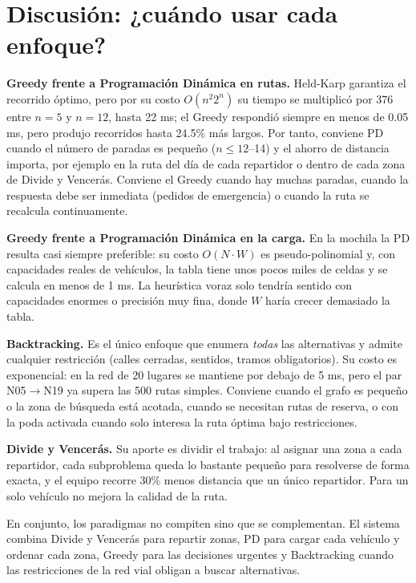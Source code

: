 \section{Discusión: ¿cuándo usar cada enfoque?}

\textbf{Greedy frente a Programación Dinámica en rutas.} Held-Karp garantiza el recorrido óptimo, pero por su costo $O(n^2 2^n)$ su tiempo se multiplicó por 376 entre $n=5$ y $n=12$, hasta 22 ms; el Greedy respondió siempre en menos de 0.05 ms, pero produjo recorridos hasta 24.5\% más largos. Por tanto, conviene PD cuando el número de paradas es pequeño ($n \le 12$--14) y el ahorro de distancia importa, por ejemplo en la ruta del día de cada repartidor o dentro de cada zona de Divide y Vencerás. Conviene el Greedy cuando hay muchas paradas, cuando la respuesta debe ser inmediata (pedidos de emergencia) o cuando la ruta se recalcula continuamente.

\textbf{Greedy frente a Programación Dinámica en la carga.} En la mochila la PD resulta casi siempre preferible: su costo $O(N\cdot W)$ es pseudo-polinomial y, con capacidades reales de vehículos, la tabla tiene unos pocos miles de celdas y se calcula en menos de 1 ms. La heurística voraz solo tendría sentido con capacidades enormes o precisión muy fina, donde $W$ haría crecer demasiado la tabla.

\textbf{Backtracking.} Es el único enfoque que enumera \emph{todas} las alternativas y admite cualquier restricción (calles cerradas, sentidos, tramos obligatorios). Su costo es exponencial: en la red de 20 lugares se mantiene por debajo de 5 ms, pero el par N05$\to$N19 ya supera las 500 rutas simples. Conviene cuando el grafo es pequeño o la zona de búsqueda está acotada, cuando se necesitan rutas de reserva, o con la poda activada cuando solo interesa la ruta óptima bajo restricciones.

\textbf{Divide y Vencerás.} Su aporte es dividir el trabajo: al asignar una zona a cada repartidor, cada subproblema queda lo bastante pequeño para resolverse de forma exacta, y el equipo recorre 30\% menos distancia que un único repartidor. Para un solo vehículo no mejora la calidad de la ruta.

En conjunto, los paradigmas no compiten sino que se complementan. El sistema combina Divide y Vencerás para repartir zonas, PD para cargar cada vehículo y ordenar cada zona, Greedy para las decisiones urgentes y Backtracking cuando las restricciones de la red vial obligan a buscar alternativas.

